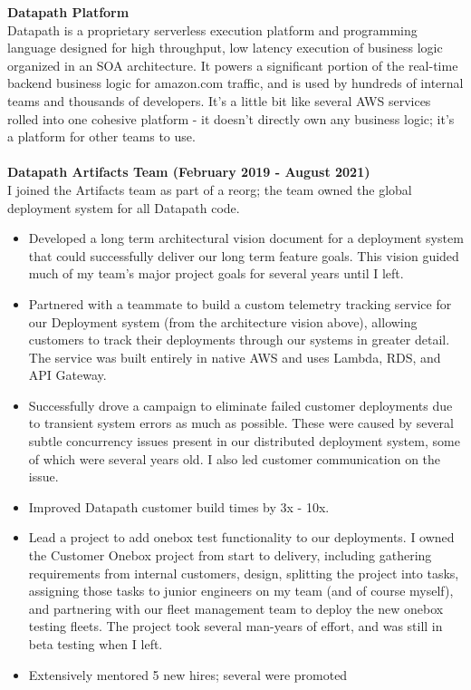 \documentclass{res}
\begin{document}
\begin{resume}
   {\large \bf Datapath Platform }\\
   Datapath is a proprietary serverless execution platform and programming language designed for high throughput, low latency execution of business logic organized in an SOA architecture.  It powers a significant portion of the real-time backend business logic for amazon.com traffic, and is used by hundreds of internal teams and thousands of developers.  It's a little bit like several AWS services rolled into one cohesive platform - it doesn't directly own any business logic; it's a platform for other teams to use.\\
   \\
   {\bf Datapath Artifacts Team (February 2019 - August 2021) }\\
   I joined the Artifacts team as part of a reorg; the team owned the global deployment system for all Datapath code.
   \begin{itemize}
   \item Developed a long term architectural vision document for a deployment system that could successfully deliver our long term feature goals.  This vision guided much of my team's major project goals for several years until I left.
   \item Partnered with a teammate to build a custom telemetry tracking service for our Deployment system (from the architecture vision above), allowing customers to track their deployments through our systems in greater detail.  The service was built entirely in native AWS and uses Lambda, RDS, and API Gateway.
   \item Successfully drove a campaign to eliminate failed customer deployments due to transient system errors as much as possible.  These were caused by several subtle concurrency issues present in our distributed deployment system, some of which were several years old.  I also led customer communication on the issue.
   \item Improved Datapath customer build times by 3x - 10x.
   \item Lead a project to add onebox test functionality to our deployments.  I owned the Customer Onebox project from start to delivery, including gathering requirements from internal customers, design, splitting the project into tasks, assigning those tasks to junior engineers on my team (and of course myself), and partnering with our fleet management team to deploy the new onebox testing fleets.  The project took several man-years of effort, and was still in beta testing when I left.
   \item Extensively mentored 5 new hires; several were promoted

\end{itemize}
\end{resume}
\end{document}

